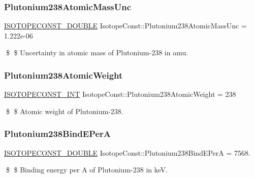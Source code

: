 \subsubsection{\texorpdfstring{Plutonium238\+Atomic\+Mass\+Unc}{Plutonium238AtomicMassUnc}}
{\footnotesize\ttfamily \mbox{\hyperlink{group___isotope_const-_macros_ga8f45a7272ce02c0b4c65c44636ed719a}{I\+S\+O\+T\+O\+P\+E\+C\+O\+N\+S\+T\+\_\+\+D\+O\+U\+B\+LE}} Isotope\+Const\+::\+Plutonium238\+Atomic\+Mass\+Unc = 1.\+222e-\/06}

\$ \$ Uncertainty in atomic mass of Plutonium-\/238 in amu. \mbox{\label{group___isotope_const-_plutonium-_pu238_ga8550db057cc932e15a55c7581553ec18}} 
\subsubsection{\texorpdfstring{Plutonium238\+Atomic\+Weight}{Plutonium238AtomicWeight}}
{\footnotesize\ttfamily \mbox{\hyperlink{group___isotope_const-_macros_ga5f18360b3e99483a35c32d789e62621c}{I\+S\+O\+T\+O\+P\+E\+C\+O\+N\+S\+T\+\_\+\+I\+NT}} Isotope\+Const\+::\+Plutonium238\+Atomic\+Weight = 238}

\$ \$ Atomic weight of Plutonium-\/238. \mbox{\label{group___isotope_const-_plutonium-_pu238_ga5af19e832913c8a479dda0e130eed25f}} 
\subsubsection{\texorpdfstring{Plutonium238\+Bind\+E\+PerA}{Plutonium238BindEPerA}}
{\footnotesize\ttfamily \mbox{\hyperlink{group___isotope_const-_macros_ga8f45a7272ce02c0b4c65c44636ed719a}{I\+S\+O\+T\+O\+P\+E\+C\+O\+N\+S\+T\+\_\+\+D\+O\+U\+B\+LE}} Isotope\+Const\+::\+Plutonium238\+Bind\+E\+PerA = 7568.}

\$ \$ Binding energy per A of Plutonium-\/238 in keV. \mbox{\label{group___isotope_const-_plutonium-_pu238_ga82d7b64c47dc61573b1f3e14314326e1}} 
